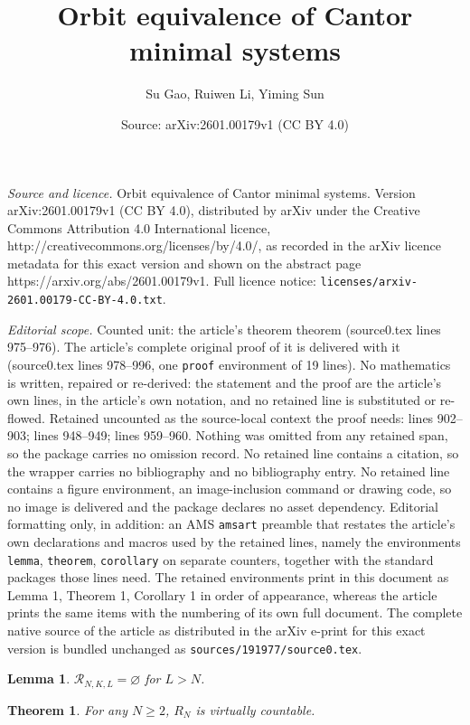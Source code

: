 \documentclass[10pt,a4paper]{amsart}
\title{Orbit equivalence of Cantor minimal systems}
\author{Su Gao, Ruiwen Li, Yiming Sun}
\date{Source: arXiv:2601.00179v1 (CC BY 4.0)}
\newtheorem{lemma}{Lemma}
\newtheorem{theorem}{Theorem}
\begin{document}
\maketitle

\noindent\emph{Source and licence.} Orbit equivalence of Cantor minimal systems. Version arXiv:2601.00179v1 (CC BY 4.0), distributed by arXiv under the Creative Commons Attribution 4.0 International licence, http://creativecommons.org/licenses/by/4.0/, as recorded in the arXiv licence metadata for this exact version and shown on the abstract page https://arxiv.org/abs/2601.00179v1. Full licence notice: \texttt{licenses/arxiv-2601.00179-CC-BY-4.0.txt}.\par\smallskip

\noindent\textit{Editorial scope.} Counted unit: the article's theorem theorem (source0.tex lines 975--976). The article's complete original proof of it is delivered with it (source0.tex lines 978--996, one \texttt{proof} environment of 19 lines). No mathematics is written, repaired or re-derived: the statement and the proof are the article's own lines, in the article's own notation, and no retained line is substituted or re-flowed.  Retained uncounted as the source-local context the proof needs: lines 902--903; lines 948--949; lines 959--960.  Nothing was omitted from any retained span, so the package carries no omission record.  No retained line contains a citation, so the wrapper carries no bibliography and no bibliography entry.  No retained line contains a figure environment, an image-inclusion command or drawing code, so no image is delivered and the package declares no asset dependency.  Editorial formatting only, in addition: an AMS \texttt{amsart} preamble that restates the article's own declarations and macros used by the retained lines, namely the environments \texttt{lemma}, \texttt{theorem}, \texttt{corollary} on separate counters, together with the standard packages those lines need.  The retained environments print in this document as Lemma 1, Theorem 1, Corollary 1 in order of appearance, whereas the article prints the same items with the numbering of its own full document.  The complete native source of the article as distributed in the arXiv e-print for this exact version is bundled unchanged as \texttt{sources/191977/source0.tex}.
\begin{lemma}\label{lem:NKL} $\mathcal{R}_{N,K,L}=\varnothing$ for $L>N$.
\end{lemma}

\begin{theorem}\label{thm:rn} For any $N\geq 2$, $R_N$ is virtually countable.
\end{theorem}
\end{document}
